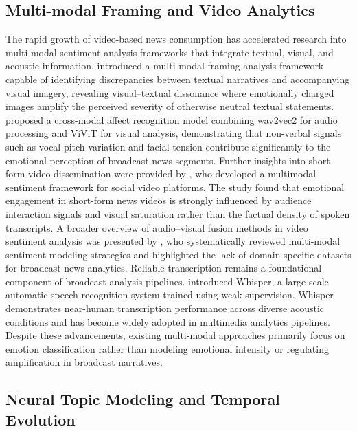 \documentclass[final,1p,times]{elsarticle}
\begin{document}
\subsection{Multi-modal Framing and Video Analytics}

The rapid growth of video-based news consumption has accelerated research into multi-modal sentiment analysis frameworks that integrate textual, visual, and acoustic information. \cite{arora2025multi} introduced a multi-modal framing analysis framework capable of identifying discrepancies between textual narratives and accompanying visual imagery, revealing visual–textual dissonance where emotionally charged images amplify the perceived severity of otherwise neutral textual statements. \cite{malik2025multimodal} proposed a cross-modal affect recognition model combining wav2vec2 for audio processing and ViViT for visual analysis, demonstrating that non-verbal signals such as vocal pitch variation and facial tension contribute significantly to the emotional perception of broadcast news segments. Further insights into short-form video dissemination were provided by \cite{he2025multimodal}, who developed a multimodal sentiment framework for social video platforms. The study found that emotional engagement in short-form news videos is strongly influenced by audience interaction signals and visual saturation rather than the factual density of spoken transcripts. A broader overview of audio–visual fusion methods in video sentiment analysis was presented by \cite{baberwal2025systematic}, who systematically reviewed multi-modal sentiment modeling strategies and highlighted the lack of domain-specific datasets for broadcast news analytics. Reliable transcription remains a foundational component of broadcast analysis pipelines. \cite{radford2025whisper} introduced Whisper, a large-scale automatic speech recognition system trained using weak supervision. Whisper demonstrates near-human transcription performance across diverse acoustic conditions and has become widely adopted in multimedia analytics pipelines. Despite these advancements, existing multi-modal approaches primarily focus on emotion classification rather than modeling emotional intensity or regulating amplification in broadcast narratives.

\subsection{Neural Topic Modeling and Temporal Evolution}
\end{document}
